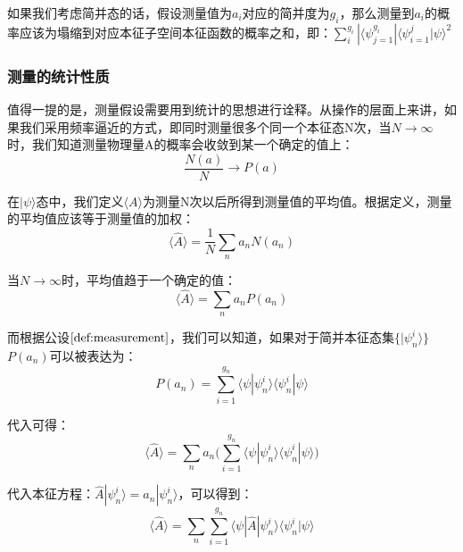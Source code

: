         如果我们考虑简并态的话，假设测量值为$a_i$对应的简并度为$g_i$，那么测量到$a_i$的概率应该为塌缩到对应本征子空间本征函数的概率之和，即：$\sum_i^{g_i}|\langle\psi_{j=1}^{g_i}|\langle\psi_{i=1}^j|\psi\rangle^2$
        \subsubsection{测量的统计性质}
        值得一提的是，测量假设需要用到统计的思想进行诠释。从操作的层面上来讲，如果我们采用频率逼近的方式，即同时测量很多个同一个本征态N次，当$N\rightarrow \infty$时，我们知道测量物理量A的概率会收敛到某一个确定的值上：
        \begin{equation}
            \frac{N(a)}{N}\rightarrow P(a)
        \end{equation}
        
        在$|\psi\rangle$态中，我们定义$\langle A\rangle$为测量N次以后所得到测量值的平均值。根据定义，测量的平均值应该等于测量值的加权：
        \begin{equation}
            \langle \hat{A} \rangle=\frac{1}{N}\sum_n a_n N(a_n)
        \end{equation}
        
        当$N\rightarrow \infty$时，平均值趋于一个确定的值：
        \begin{equation}
             \langle \hat{A} \rangle=\sum_n a_n P(a_n)
        \end{equation}
        
        而根据公设$\ref{def:measurement}$，我们可以知道，如果对于简并本征态集$\{|\psi_n^i\rangle\}$ $P(a_n)$可以被表达为：
        \begin{equation}
            P(a_n)=\sum_{i=1}^{g_n}\langle\psi|\psi_n^i\rangle\langle \psi_n^i|\psi\rangle
        \end{equation}
        
        代入可得：
        \begin{equation}
             \langle \hat{A} \rangle=\sum_n a_n \Big(\sum_{i=1}^{g_n}\langle\psi|\psi_n^i\rangle\langle \psi_n^i|\psi\rangle\Big)
        \end{equation}
        
        代入本征方程：$\hat{A}|\psi_n^i\rangle=a_n|\psi_n^i\rangle$，可以得到：
        \begin{equation}
            \langle \hat{A} \rangle=\sum_n  \sum_{i=1}^{g_n}\langle\psi|\hat{A}|\psi_n^i\rangle\langle \psi_n^i|\psi\rangle
        \end{equation}
        
